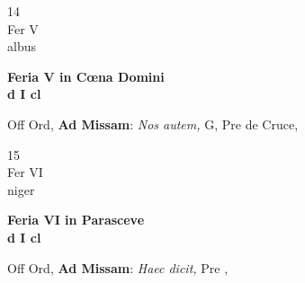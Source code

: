 \documentclass[10pt, openany]{book}
\begin{document}
        \begin{center}
            \begin{minipage}{3.5in}
                \vspace{2em}
                \begin{minipage}{0.5in}
                    {\Huge 14} \\
                    {\normalsize Fer V} \\
                    {\normalsize albus}
                \end{minipage}
                \begin{minipage}{3.0in}
                    \textbf{ \large Feria V in Cœna Domini \\
                    \textnormal{\normalsize d I cl}} \\ 
                \end{minipage}
                \begin{justify}Off Ord, \textbf{Ad Missam}: \textit{Nos autem,} G, Pre de Cruce,  
                \end{justify}
            \end{minipage}
        \end{center}
    
        \begin{center}
            \begin{minipage}{3.5in}
                \vspace{2em}
                \begin{minipage}{0.5in}
                    {\Huge 15} \\
                    {\normalsize Fer VI} \\
                    {\normalsize niger}
                \end{minipage}
                \begin{minipage}{3.0in}
                    \textbf{ \large Feria VI in Parasceve \\
                    \textnormal{\normalsize d I cl}} \\ 
                \end{minipage}
                \begin{justify}Off Ord, \textbf{Ad Missam}: \textit{Haec dicit,} Pre ,  
                \end{justify}
            \end{minipage}
        \end{center}
    
\end{document}
